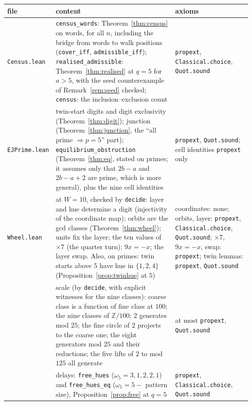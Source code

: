 \documentclass[11pt]{article}
\newcommand{\Z}{\mathbb Z}
\theoremstyle{plain}
\theoremstyle{definition}
\theoremstyle{remark}
\begin{document}
\begin{center}
\begin{tabular}{@{}p{}p{}p{}@{}}
\toprule
file & content & axioms\\
\midrule
\texttt{Census.lean} & \texttt{census\_words}: Theorem~\ref{thm:census} on words, for all $n$,
including the bridge from words to walk positions (\texttt{cover\_iff}, \texttt{admissible\_iff});
\texttt{realised\_admissible}: Theorem~\ref{thm:realised} at $q=5$ for $a>5$, with the seed
counterexample of Remark~\ref{rem:seed} checked; \texttt{census}: the inclusion--exclusion count
& \texttt{propext}, \texttt{Classical.choice}, \texttt{Quot.sound}\\
\texttt{EJPrime.lean} & twin-start digits and digit exclusivity (Theorem~\ref{thm:digit}); junction
(Theorem~\ref{thm:junction}, the ``all prime $\Rightarrow p=5$'' part);
\texttt{equilibrium\_obstruction} (Theorem~\ref{thm:eq}, stated on primes; it assumes only that
$2b-a$ and $2b-a+2$ are prime, which is more general), plus the nine cell identities & \texttt{propext}, \texttt{Quot.sound}; cell identities \texttt{propext} only\\
\texttt{Wheel.lean} & at $W=10$, checked by \texttt{decide}: layer and hue determine a digit
(injectivity of the coordinate map); orbits are the gcd classes (Theorem~\ref{thm:wheel});
units fix the layer; the ten values of $\times7$ (the quarter turn); $9x=-x$; the layer swap. Also,
on primes: twin starts above $5$ have hue in $\{1,2,4\}$ (Proposition~\ref{prop:twinhue} at $5$)
& coordinates: none; orbits, layer: \texttt{propext}, \texttt{Classical.choice}, \texttt{Quot.sound};
$\times7$, $9x=-x$, swap: \texttt{propext}; twin lemmas: \texttt{propext}, \texttt{Quot.sound}\\
 & scale (by \texttt{decide}, with explicit witnesses for the nine classes): coarse class is a function of fine class at $100$; the nine classes
of $\Z/100$; $2$ generates mod $25$; the fine circle of $2$ projects to the coarse one; the eight
generators mod $25$ and their reductions; the five lifts of $2$ to mod $125$ all generate
& at most \texttt{propext}, \texttt{Quot.sound}\\
 & delays: \texttt{free\_hues} ($\omega_5=3,1,2,2,1$) and \texttt{free\_hues\_eq} ($\omega_5=5-$
pattern size), Proposition~\ref{prop:free} at $q=5$ & \texttt{propext}, \texttt{Classical.choice},
\texttt{Quot.sound}\\
\bottomrule
\end{tabular}
\end{center}
\end{document}

